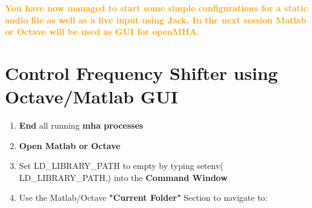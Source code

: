 \documentclass[11pt,a4paper,twoside]{article}
\newcommand{\+}{\discretionary{\mbox{\scriptsize$\hookleftarrow$}}{}{}}
\begin{document}
{{\begin{enumerate}
\end{enumerate}

\textcolor{orange}{\textbf{You have now managed to start some simple configurations for a static audio file as well as a live input using Jack. In the next session Matlab or Octave will be used as GUI for openMHA.}}


\newpage

\section{Control Frequency Shifter using Octave/Matlab GUI}
\label{sec:freqshifter}




\begin{enumerate}
\item \textbf{End} all running \textbf{mha processes} 
\item \textbf{Open Matlab or Octave} 
\item Set LD\_LIBRARY\_PATH to empty by typing {\ttfamily
  setenv(\textquotesingle
  LD\_LIBRARY\_PATH\textquotesingle,\textquotesingle\textquotesingle)}
  into the \textbf{Command Window}
\item Use the Matlab/Octave \textbf{"Current Folder"} Section to navigate to:


\end{enumerate}}}
\end{document}

